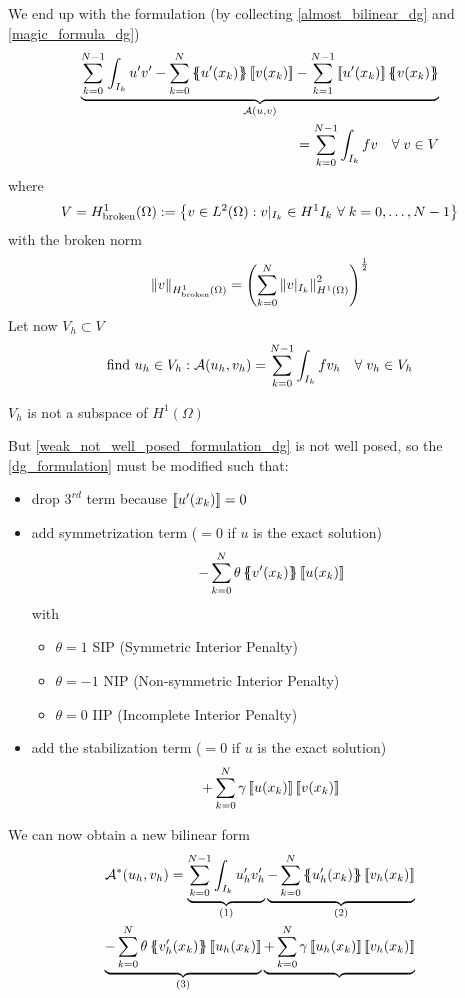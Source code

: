 We end up with the formulation (by collecting \eqref{almost_bilinear_dg} and \eqref{magic_formula_dg})
\begin{equation}
    \begin{split}
        \underbrace{\sum_{k=0}^{N-1}\int_{I_k} u'v' - \sum_{k=0}^{N} \average{u'(x_k)}\jump{v(x_k)} - \sum_{k=1}^{N-1} \jump{u'(x_k)}\average{v(x_k)}}_{\mathcal{A}(u,v)} \\
        = \sum_{k=0}^{N-1}\int_{I_k} fv \quad \forall \; v \in V \label{dg_formulation}
    \end{split}
\end{equation}
where 
\[
    V = H^1_{\text{broken}}(\Omega) := \left\{ v \in L^2(\Omega) : v\vert_{I_k} \in H^1{I_k} \ \forall \; k = 0,\ldots, N-1 \right\}
\]
with the broken norm 
\[
    \norm{v}_{H^1_{\text{broken}}(\Omega)} = \left( \sum_{k=0}^{N} \norm{v\vert_{I_k}}_{H^1(\Omega)}^2 \right)^{\frac{1}{2}}
\]
Let now \(V_h \subset V\)
\begin{equation}
    \text{find } u_h \in V_h : \mathcal{A}(u_h, v_h) = \sum_{k=0}^{N-1} \int_{I_k} fv_h \quad \forall \; v_h \in V_h \label{weak_not_well_posed_formulation_dg}
\end{equation}
\begin{remark}
    \(V_h\) is not a subspace of \(H^1(\Omega)\)
\end{remark}
But \eqref{weak_not_well_posed_formulation_dg} is not well posed, so the \eqref{dg_formulation} must be modified such that:
\begin{itemize}
    \item drop \(3^{rd}\) term because \(\left[\!\left[u'(x_k)\right]\!\right] = 0\)
    \item add symmetrization term (\(=0\) if \(u\) is the exact solution) 
    \[
        -\sum_{k=0}^{N} \theta \left\{\mspace{-6.5mu}\left\{v'(x_k)\right\}\mspace{-6.5mu}\right\}\left[\!\left[u(x_k)\right]\!\right]
    \]
    with
    \begin{itemize}
        \item[\qedhere] \(\theta = 1\) SIP (Symmetric Interior Penalty)
        \item[\qedhere] \(\theta = -1\) NIP (Non-symmetric Interior Penalty)
        \item[\qedhere] \(\theta = 0\) IIP (Incomplete Interior Penalty)
    \end{itemize}
    \item add the stabilization term (\(=0\) if \(u\) is the exact solution)
    \[
        +\sum_{k=0}^{N} \gamma \left[\!\left[u(x_k)\right]\!\right]\left[\!\left[v(x_k)\right]\!\right]
    \]
\end{itemize}
We can now obtain a new bilinear form
\begin{equation}
    \begin{split}
        \mathcal{A}^*(u_h, v_h) = \underbrace{\sum_{k=0}^{N-1} \int_{I_k} u'_h v'_h}_{(1)} \underbrace{-\sum_{k=0}^{N} \average{u'_h(x_k)} \jump{v_h(x_k)}}_{(2)} \\
        \underbrace{-\sum_{k=0}^{N} \theta \average{v'_h(x_k)} \jump{u_h(x_k)}}_{(3)} \underbrace{+\sum_{k=0}^{N} \gamma \jump{u_h(x_k)}\jump{v_h(x_k)}} \label{new_bilinear_form_dg} 
    \end{split}
\end{equation}
